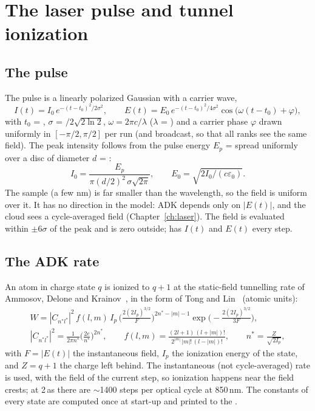 \chapter{The laser pulse and tunnel ionization}
\label{ch:adk}

\section{The pulse}

The pulse is a linearly polarized Gaussian with a carrier wave,
\begin{equation}
  I(t) = I_0\,e^{-(t-t_0)^2/2\sigma^2},\qquad
  E(t) = E_0\,e^{-(t-t_0)^2/4\sigma^2}\cos\!\big(\omega(t-t_0)+\varphi\big),
\end{equation}
with $t_0$ = , $\sigma$ = $/2\sqrt{2\ln2}$, $\omega = 2\pi c/\lambda$
($\lambda$ = ) and a carrier phase $\varphi$ drawn uniformly in $[-\pi/2,\pi/2]$ per run (and
broadcast, so that all ranks see the same field).
The peak intensity follows from the pulse energy $E_p$ =  spread uniformly over a disc of diameter
$d$ = :
\begin{equation}
  I_0 = \frac{E_p}{\pi(d/2)^2\,\sigma\sqrt{2\pi}},\qquad E_0 = \sqrt{2I_0/(c\varepsilon_0)}.
\end{equation}
The sample (a few nm) is far smaller than the wavelength, so the field is uniform over it.
It has no direction in the model: ADK depends only on $|E(t)|$, and the cloud sees a cycle-averaged field
(Chapter~\ref{ch:laser}).
The field is evaluated within $\pm6\sigma$ of the peak and is zero outside;  has $I(t)$ and
$E(t)$ every step.

\section{The ADK rate}

An atom in charge state $q$ is ionized to $q+1$ at the static-field tunnelling rate of Ammosov, Delone and
Krainov~\cite{adk1986}, in the form of Tong and Lin~\cite{tong2002} (atomic units):
\begin{gather}
  W = |C_{n^*l^*}|^2\,f(l,m)\,I_p\,\Big(\frac{2(2I_p)^{3/2}}{F}\Big)^{2n^*-|m|-1}
      \exp\!\Big(-\frac{2(2I_p)^{3/2}}{3F}\Big),\\
  |C_{n^*l^*}|^2 = \frac{1}{2\pi n^*}\Big(\frac{2e}{n^*}\Big)^{2n^*},\qquad
  f(l,m) = \frac{(2l+1)\,(l+|m|)!}{2^{|m|}\,|m|!\,(l-|m|)!},\qquad n^* = \frac{Z}{\sqrt{2I_p}},
\end{gather}
with $F = |E(t)|$ the instantaneous field, $I_p$ the ionization energy of the state, and $Z = q+1$ the charge left
behind.
The instantaneous (not cycle-averaged) rate is used, with the field of the current step, so ionization happens near the
field crests; at 2\,as there are $\sim$1400 steps per optical cycle at 850\,nm.
The constants of every state are computed once at start-up and printed to the .

